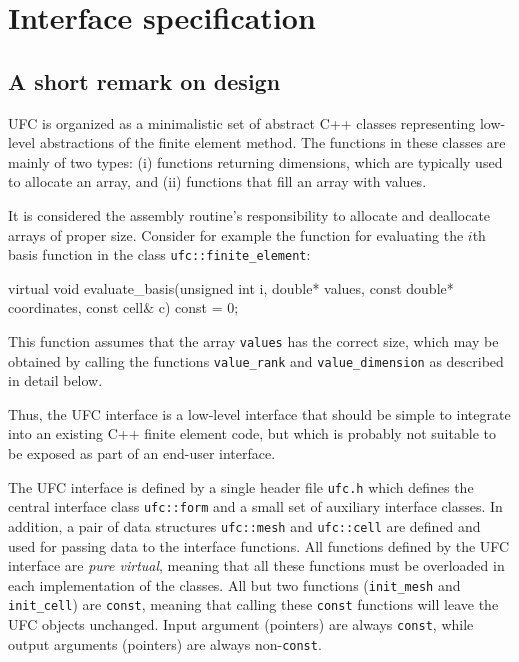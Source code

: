 \chapter{Interface specification}
\label{sec:interface}

\section{A short remark on design}

UFC is organized as a minimalistic set of abstract C++ classes
representing low-level abstractions of the finite element method. The
functions in these classes are mainly of two types: (i) functions
returning dimensions, which are typically used to allocate an array,
and (ii) functions that fill an array with values.

It is considered the assembly routine's responsibility
to allocate and deallocate arrays of proper size.
Consider for example the function for evaluating the $i$th basis
function in the class \texttt{ufc::finite\_element}:
\begin{code}
virtual void evaluate_basis(unsigned int i,
                            double* values,
                            const double* coordinates,
                            const cell& c) const = 0;
\end{code}
This function assumes that the array \texttt{values} has the correct
size, which may be obtained by calling the functions
\texttt{value\_rank} and \texttt{value\_dimension} as described in
detail below.

Thus, the UFC interface is a low-level interface that should be simple
to integrate into an existing C++ finite element code, but which is
probably not suitable to be exposed as part of an end-user interface.

The UFC interface is defined by a single header file \texttt{ufc.h}
which defines the central interface class \texttt{ufc::form} and a
small set of auxiliary interface classes. In addition, a pair of data
structures \texttt{ufc::mesh} and \texttt{ufc::cell} are defined and
used for passing data to the interface functions. All functions
defined by the UFC interface are \emph{pure virtual}, meaning that all
these functions must be overloaded in each implementation of the
classes.  All but two functions (\texttt{init\_mesh} and
\texttt{init\_cell}) are \texttt{const}, meaning that calling these
\texttt{const} functions will leave the UFC objects unchanged.  Input
argument (pointers) are always \texttt{const}, while output arguments
(pointers) are always non-\texttt{const}.  


